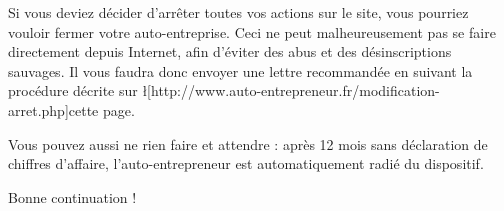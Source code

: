 ﻿Si vous deviez décider d'arrêter toutes vos actions sur le site, vous pourriez vouloir fermer votre auto-entreprise.
Ceci ne peut malheureusement pas se faire directement depuis Internet, afin d'éviter des abus et des désinscriptions sauvages. Il vous faudra donc envoyer une lettre recommandée en suivant la procédure décrite sur \l[http://www.auto-entrepreneur.fr/modification-arret.php]{cette page}.

Vous pouvez aussi ne rien faire et attendre :     après 12 mois sans déclaration de chiffres d'affaire, l'auto-entrepreneur est automatiquement radié du dispositif.

Bonne continuation !